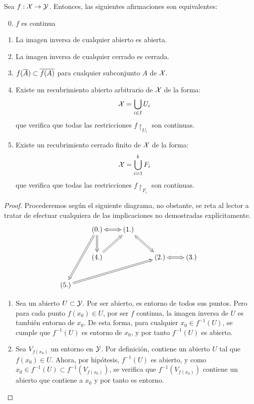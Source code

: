\begin{prop}
	\label{cont_prop_caracterizacion}
	Sea $f:\mathcal{X}\to\mathcal{Y}$. Entonces, las siguientes afirmaciones son equivalentes:
	
	\begin{enumerate}
		\setcounter{enumi}{-1}
		\item $f$ es continua
		\item La imagen inversa de cualquier abierto es abierta.
		\item La imagen inversa de cualquier cerrado es cerrada.
		\item $f(\overline{A})\subset\overline{f(A)}$ para cualquier subconjunto $A$ de $\mathcal{X}$.
		\item Existe un recubrimiento abierto arbitrario de $\mathcal{X}$ de la forma:
			\[\mathcal{X}=\bigcup\limits_{i\in I} U_i\]
			que verifica que todas las restricciones $f\restriction_{U_i}$ son continuas.
		\item Existe un recubrimiento cerrado finito de $\mathcal{X}$ de la forma:
			\[\mathcal{X}=\bigcup\limits_{i=1}^k F_i\]
			que verifica que todas las restricciones $f\restriction_{F_i}$ son continuas.
	\end{enumerate}

	\begin{proof}
		Procederemos según el siguiente diagrama, no obstante, se reta al lector a tratar de efectuar cualquiera de las implicaciones no demostradas explícitamente.
		\[
		\xymatrix{&(0.)\ar@2{<->}[r]\ar@{=>}[d]&(1.)\ar@2{<->}[dr]& &\\
			&(4.)\ar@{=>}[ur] & &(2.)\ar@2{<->}[r]&(3.)\\
			(5.)\ar@{<=}[uur] \ar@{=>}[urrr]& & & &}
		\]
		\begin{enumerate}[align=left, leftmargin=*]
			\item[\fbox{$(0)\implies (1)$}] Sea un abierto $U\subset\mathcal{Y}$. Por ser abierto, es entorno de todos sus puntos. Pero para cada punto $f(x_0)\in U$, por ser $f$ continua, la imagen inversa de $U$ es también entorno de $x_0$. De esta forma, para cualquier $x_0\in f^{-1}(U)$, se cumple que $f^{-1}(U)$ es entorno de $x_0$, y por tanto $f^{-1}(U)$ es abierto.
			
			\item[\fbox{$(1)\implies (0)$}] Sea $V_{f(x_0)}$ un entorno en $\mathcal{Y}$. Por definición, contiene un abierto $U$ tal que $f(x_0)\in U$. Ahora, por hipótesis, $f^{-1}(U)$ es abierto, y como $x_0\in f^{-1}(U)\subset f^{-1}(V_{f(x_0)})$, se verifica que $f^{-1}(V_{f(x_0)})$ contiene un abierto que contiene a $x_0$ y por tanto es entorno.
			

\end{enumerate}
\end{proof}
\end{prop}
